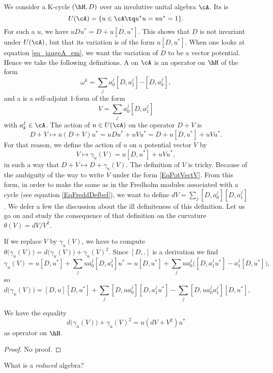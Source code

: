 We consider a K-cycle $(\hH,D)$ over an involutive unital algebra $\cA$. Its  is
\[
	U(\cA)=\{ u\in\cA\tq u^*u=uu^*=1 \}.
\]
For such a $u$, we have $uDu^*=D+u[D,u^*]$. This shows that $D$ is not invariant under $U(\cA)$, but that its variation is of the form $u[D,u^*]$. When one looks at equation \eqref{eq_jaugeA_em}, we want the variation of $D$ to be a vector potential. Hence we take the following definitions. A  on $\cA$ is an operator on $\hH$ of the form
\[
	\omega^k=\sum_{j}a_0^j[D,a_1^j]\cdots[D,a_k^j],
\]
and a  is a self-adjoint $1$-form of the form
\begin{equation}   \label{EqPotVectV}
	V=\sum_{j}a_0^j[D,a_1^j]
\end{equation}
with $a_k^j\in\cA$. The action of $u\in U(\cA)$ on the operator $D+V$ is
\[
	D+V\mapsto u(D+V)u^*=uDu^*+uVu^*=D+u[D,u^*]+uVu^*.
\]
For that reason, we define the action of $u$ on a potential vector $V$ by
\[
	V\mapsto\gamma_u(V)=u[D,u^*]+uVu^*,
\]
in such a way that $D+V\mapsto D+\gamma_u(V)$. The definition of $V$ is tricky. Because of the ambiguity of the way to write $V$ under the form \eqref{EqPotVectV}. From this form, in order to make the same as in the Fredholm modules associated with a cycle (see equation \eqref{EqFreddDefbel}), we want to define $dV=\sum_{j}[D,a^j_0][D,a^j_1]$. We defer a few the discussion about the ill definiteness of this definition. Let us go on and study the consequence of that definition on the curvature $\theta(V)=dV/V^2$.

If we replace $V$ by $\gamma_u(V)$, we have to compute $\theta\big( \gamma_u(V) \big)=d\big( \gamma_u(V) \big)+\gamma_u(V)^2$. Since $[D,.]$ is a derivation we find
\[
	\gamma_u(V)=u[D,u^*]+\sum_{j}ua^j_0[D,a^j_1]u^*
	=u[D,u^*]+\sum_{j}ua^j_0\big( [D,a^j_1u^*]-a^j_1[D,u^*] \big),
\]
so
\[
	d\big( \gamma_u(V) \big)=[D,u][D,u^*]+\sum_{j}[D,ua^j_0][D,a^j_1u^*]-\sum_{j}[D,ua^j_0a^j_1][D,u^*],
\]

\begin{proposition}
	We have the equality
	\[
		d\big( \gamma_u(V) \big)+\gamma_u(V)^2=u(dV+V^2)u^*
	\]
	as operator on $\hH$.
\end{proposition}
\begin{proof}
	No proof.
\end{proof}

\begin{probleme}
	What is a \emph{reduced} algebra?
\end{probleme}

